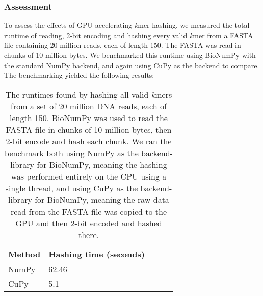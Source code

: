 \subsubsection{Assessment}
To assess the effects of GPU accelerating \textit{k}mer hashing, we measured the total runtime of reading, 2-bit encoding and hashing every valid \textit{k}mer from a FASTA file containing 20 million reads, each of length 150.
The FASTA was read in chunks of 10 million bytes.
We benchmarked this runtime using BioNumPy with the standard NumPy backend, and again using CuPy as the backend to compare.
The benchmarking yielded the following results:
\begin{table}[H]
\begin{center}
\begin{tabular}{lllll}
\multicolumn{1}{l|}{\textbf{Method}} & \multicolumn{1}{l}{\textbf{Hashing time (seconds)}} &  \\ \cline{1-2}
\multicolumn{1}{l|}{NumPy} & \multicolumn{1}{l}{62.46} &  \\
\multicolumn{1}{l|}{CuPy} & \multicolumn{1}{l}{5.1} &  \\
\end{tabular}
\end{center}
\caption{
  The runtimes found by hashing all valid \textit{k}mers from a set of 20 million DNA reads, each of length 150.
  BioNumPy was used to read the FASTA file in chunks of 10 million bytes, then 2-bit encode and hash each chunk.
  We ran the benchmark both using NumPy as the backend-library for BioNumPy, meaning the hashing was performed entirely on the CPU using a single thread, and using CuPy as the backend-library for BioNumPy, meaning the raw data read from the FASTA file was copied to the GPU and then 2-bit encoded and hashed there.
}
\label{methods:gpu_accelerating_kmer_hashing:tables:benchmark}
\end{table}

